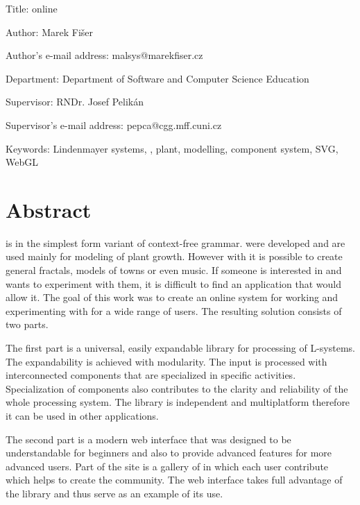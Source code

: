 {
\setlength\parindent{0mm}
\setlength\parskip{5mm}

Title: \lsystems online

Author: Marek Fišer

Author's e-mail address: malsys@marekfiser.cz

Department: Department of Software and Computer Science Education

Supervisor: RNDr. Josef Pelikán

Supervisor's e-mail address: pepca@cgg.mff.cuni.cz

Keywords: Lindenmayer systems, \lsystems, plant, modelling, component system, SVG, WebGL

\section*{Abstract}
}
\lsystem is in the simplest form variant of context-free grammar.
\lsystems were developed and are used mainly for modeling of plant growth.
However with \lsystems it is possible to create general fractals, models of towns or even music.
If someone is interested in \lsystems and wants to experiment with them, it is difficult to find an application that would allow it.
The goal of this work was to create an online system for working and experimenting with \lsystems for a wide range of users.
The resulting solution consists of two parts.

The first part is a universal, easily expandable library for processing of \mbox{L-sys}\-tems.
The expandability is achieved with modularity.
The input is processed with interconnected components that are specialized in specific activities.
Specialization of components also contributes to the clarity and reliability of the whole processing system.
The library is independent and multiplatform therefore it can be used in other applications.

The second part is a modern web interface that was designed to be understandable for beginners and also to provide advanced features for more advanced users.
Part of the site is a gallery of \lsystems in which each user contribute which helps to create the community.
The web interface takes full advantage of the library and thus serve as an example of its use.




































